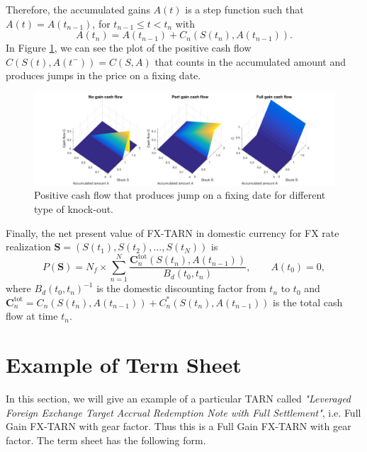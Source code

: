 Therefore, the accumulated gains $A(t)$ is a step function such that $A(t) = A(t_{n-1})$, for $t_{n-1}\leq t < t_n$ with
\[A(t_n)= A(t_{n-1}) + C_n(S(t_n),A(t_{n-1})).\]
In Figure \ref{fig:cash-flow}, we can see the plot of the positive cash flow $C(S(t),A(t^-)) = C(S,A)$ that counts in the accumulated amount and produces jumps in the price on a fixing date.
\begin{figure}[!htb]
\centering
	\includegraphics[width=\textwidth]{gfx/Cash-flow}
	\caption{Positive cash flow that produces jump on a fixing date for different type of knock-out.}
	\label{fig:cash-flow}
\end{figure}

Finally, the net present value of FX-TARN in domestic currency for FX rate realization $\mathbf{S} = (S(t_1),S(t_2),\ldots,S(t_N))$ is
\begin{equation}\label{eq:intro:pv}
P(\mathbf{S}) =N_f \times \sum_{n=1}^N\frac{\mathbf{C}^\text{tot}_n(S(t_n),A(t_{n-1}))}{B_d(t_0,t_n)}, \qquad A(t_0)=0,
\end{equation}
where $B_d(t_0,t_n)^{-1}$ is the domestic discounting factor from $t_n$ to $t_0$ and $\mathbf{C}^\text{tot}_n = C_n(S(t_n),A(t_{n-1}))+C^\ast_n(S(t_n),A(t_{n-1}))$ is the total cash flow at time $t_n$.

\section{Example of Term Sheet}
\label{sec:intro:term_sheet}
In this section, we will give an example of a particular TARN called \textit{"Leveraged Foreign Exchange Target Accrual Redemption Note with Full Settlement"}, i.e. Full Gain FX-TARN with gear factor. Thus this is a Full Gain FX-TARN with gear factor. The term sheet has the following form.

